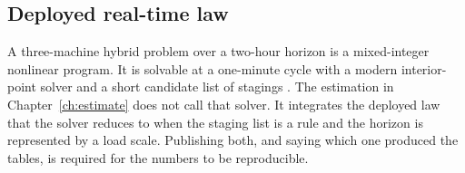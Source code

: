 \subsection{Deployed real-time law}
\label{sec:deployed}

A three-machine hybrid problem over a two-hour horizon is a mixed-integer nonlinear program. It is solvable at a one-minute cycle with a modern interior-point solver and a short candidate list of stagings \cite{wachter2006ipopt,andersson2019casadi,bemporad1999hybrid,nocedal2006}. The estimation in Chapter~\ref{ch:estimate} does not call that solver. It integrates the deployed law that the solver reduces to when the staging list is a rule and the horizon is represented by a load scale. Publishing both, and saying which one produced the tables, is required for the numbers to be reproducible.


